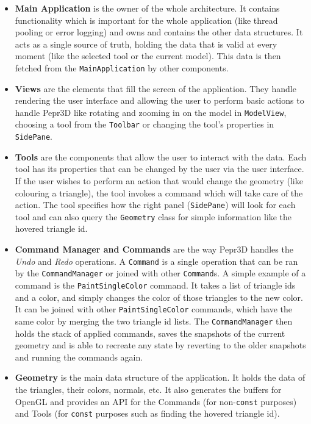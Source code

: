 \begin{itemize}
\item \textbf{Main Application} is the owner of the whole architecture. It contains functionality which is important for the whole application (like thread pooling or error logging) and owns and contains the other data structures. It acts as a single source of truth, holding the data that is valid at every moment (like the selected tool or the current model). This data is then fetched from the \texttt{MainApplication} by other components.

\item \textbf{Views} are the elements that fill the screen of the application. They handle rendering the user interface and allowing the user to perform basic actions to handle Pepr3D like rotating and zooming in on the model in \texttt{ModelView}, choosing a tool from the \texttt{Toolbar} or changing the tool's properties in \texttt{SidePane}.

\item \textbf{Tools} are the components that allow the user to interact with the data. Each tool has its properties that can be changed by the user via the user interface. If the user wishes to perform an action that would change the geometry (like colouring a triangle), the tool invokes a command which will take care of the action. The tool specifies how the right panel (\texttt{SidePane}) will look for each tool and can also query the \texttt{Geometry} class for simple information like the hovered triangle id.

\item \textbf{Command Manager and Commands} are the way Pepr3D handles the \textit{Undo} and \textit{Redo} operations. A \texttt{Command} is a single operation that can be ran by the \texttt{CommandManager} or joined with other \texttt{Command}s. A simple example of a command is the \texttt{PaintSingleColor} command. It takes a list of triangle ids and a color, and simply changes the color of those triangles to the new color. It can be joined with other \texttt{PaintSingleColor} commands, which have the same color by merging the two triangle id lists. The \texttt{CommandManager} then holds the stack of applied commands, saves the snapshots of the current geometry and is able to recreate any state by reverting to the older snapshots and running the commands again.

\item \textbf{Geometry} is the main data structure of the application. It holds the data of the triangles, their colors, normals, etc. It also generates the buffers for OpenGL and provides an API for the Commands (for non-\texttt{const} purposes) and Tools (for \texttt{const} purposes such as finding the hovered triangle id).
\end{itemize}

